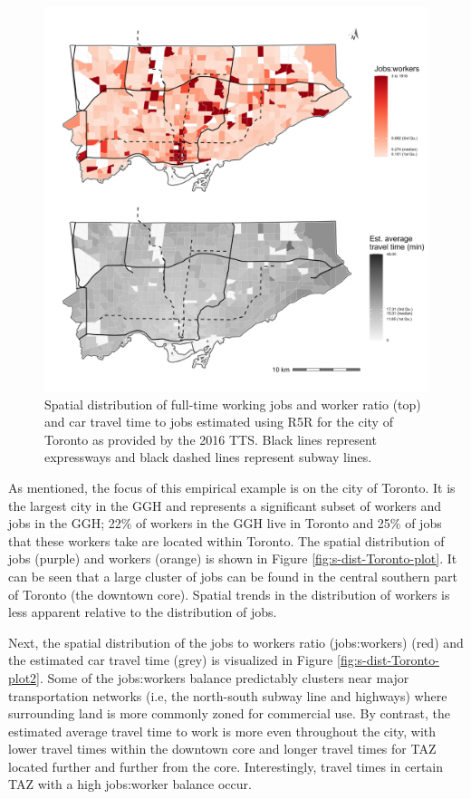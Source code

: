 \documentclass[]{elsarticle} %
\begin{document}
\begin{figure}
\includegraphics[width=1\linewidth]{images/spatial-dist-jobs-pop-Toronto-plot2} \caption{\label{fig:s-dist-Toronto-plot2}  Spatial distribution of full-time working jobs and worker ratio (top) and car travel time to jobs estimated using R5R for the city of Toronto as provided by the 2016 TTS. Black lines represent expressways and black dashed lines represent subway lines.}\label{fig:spatial-dist-Toronto-plot2}
\end{figure}

As mentioned, the focus of this empirical example is on the city of
Toronto. It is the largest city in the GGH and represents a significant
subset of workers and jobs in the GGH; 22\% of workers in the GGH live
in Toronto and 25\% of jobs that these workers take are located within
Toronto. The spatial distribution of jobs (purple) and workers (orange)
is shown in Figure \ref{fig:s-dist-Toronto-plot}. It can be seen that a
large cluster of jobs can be found in the central southern part of
Toronto (the downtown core). Spatial trends in the distribution of
workers is less apparent relative to the distribution of jobs.

Next, the spatial distribution of the jobs to workers ratio
(jobs:workers) (red) and the estimated car travel time (grey) is
visualized in Figure \ref{fig:s-dist-Toronto-plot2}. Some of the
jobs:workers balance predictably clusters near major transportation
networks (i.e, the north-south subway line and highways) where
surrounding land is more commonly zoned for commercial use. By contrast,
the estimated average travel time to work is more even throughout the
city, with lower travel times within the downtown core and longer travel
times for TAZ located further and further from the core. Interestingly,
travel times in certain TAZ with a high jobs:worker balance occur.
\end{document}
